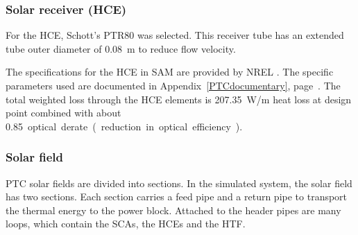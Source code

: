\subsubsection{Solar receiver (HCE)}
For the \acf{HCE}, Schott's PTR80 was selected. This receiver tube has an extended tube outer diameter of \SI{0.08}{m} to reduce flow velocity.


The specifications for the \ac{HCE} in \ac{SAM} are provided by  \ac{NREL} \cite{Kutscher2012}. The specific parameters used are documented in Appendix~\ref{PTCdocumentary}, page~\pageref{PTC_HCE}. The total weighted loss through the \ac{HCE} elements is \SI{207.35}{W/m} heat loss at design point combined with about \SI{0.85} optical derate (reduction in optical efficiency).

\subsubsection{Solar field}

\ac{PTC} solar fields are divided into sections. In the simulated system, the solar field has two sections. Each section carries a feed pipe and a return pipe to transport the thermal energy to the power block. Attached to the header pipes are many loops, which contain the \acp{SCA}, the \acp{HCE} and the \ac{HTF}. 

